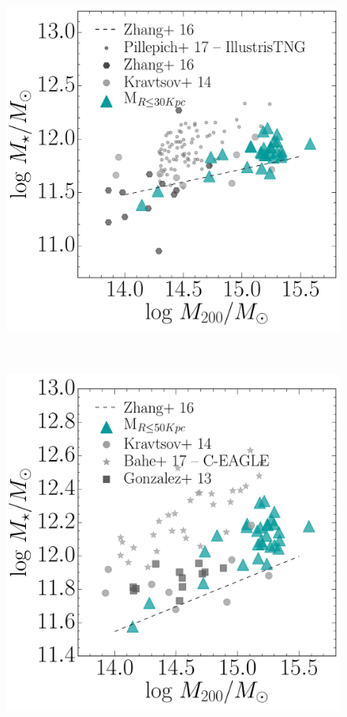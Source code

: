 \begin{figure}[H]
\centering
\includegraphics[height=12cm,width=12cm]{Figures/LR/M302D_vs_M200.pdf}
\caption[mbcg]{}
\label{fig:m30}
\end{figure}


\begin{figure}[H]
\centering
\includegraphics[height=12cm,width=12cm]{Figures/LR/M502D_vs_M200.pdf}
\caption[mbcg]{}
\label{fig:m50}
\end{figure}


